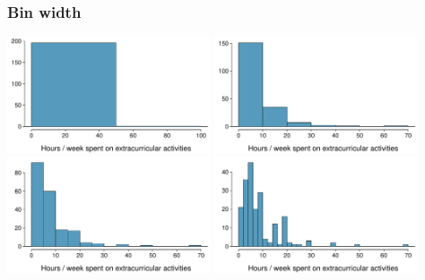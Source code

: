 \begin{frame}
\frametitle{Bin width}


\begin{center}
\includegraphics[width=0.45\textwidth]{2-1_numerical_data/figures/extracurr_hrs_hist/extracurr_hrs_hist2}
\includegraphics[width=0.45\textwidth]{2-1_numerical_data/figures/extracurr_hrs_hist/extracurr_hrs_hist} \\
\includegraphics[width=0.45\textwidth]{2-1_numerical_data/figures/extracurr_hrs_hist/extracurr_hrs_hist20}
\includegraphics[width=0.45\textwidth]{2-1_numerical_data/figures/extracurr_hrs_hist/extracurr_hrs_hist30}
\end{center}

\end{frame}


